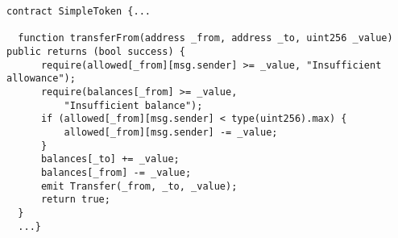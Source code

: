 \begin{lstlisting}[language=Solidity]
contract SimpleToken {...

  function transferFrom(address _from, address _to, uint256 _value) public returns (bool success) {
      require(allowed[_from][msg.sender] >= _value, "Insufficient allowance");
      require(balances[_from] >= _value, 
      	  "Insufficient balance");
      if (allowed[_from][msg.sender] < type(uint256).max) {
          allowed[_from][msg.sender] -= _value;
      }
      balances[_to] += _value;
      balances[_from] -= _value;
      emit Transfer(_from, _to, _value);
      return true;
  }    
  ...}
\end{lstlisting}